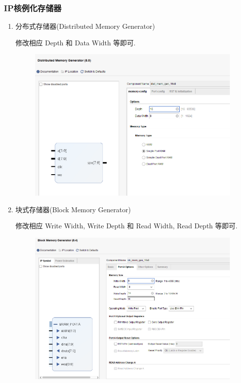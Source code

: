 \documentclass[UTF8]{article}
\begin{document}
\subsubsection{IP核例化存储器}
\begin{enumerate}
	\item 分布式存储器(Distributed Memory Generator)\par
	修改相应 Depth 和 Data Width 等即可.
	\begin{figure}[H]
		\centering
		\includegraphics[scale=0.4]{IP_dist.png}
	\end{figure}\par
	
	\item 块式存储器(Block Memory Generator)\par
	修改相应 Write Width, Write Depth 和 Read Width, Read Depth 等即可.
	\begin{figure}[H]
		\centering
		\includegraphics[scale=0.4]{IP_blk.png}
	\end{figure}\par
	

\end{enumerate}
\end{document}

